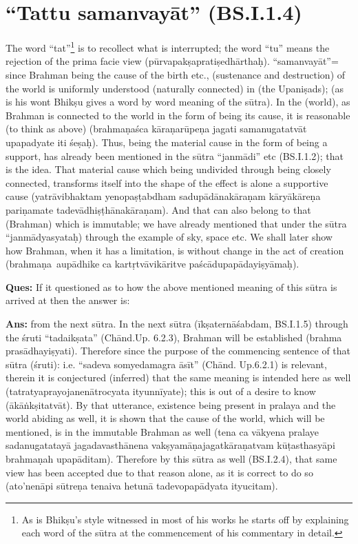 \section*{“Tattu samanvayāt” (BS.I.1.4)}

The word “tat”\footnote{As is Bhikṣu’s style witnessed in most of his works he starts off by explaining each word of the sūtra at the commencement of his commentary in detail.} is to recollect what is interrupted; the word “tu” means the rejection of the prima facie view (pūrvapakṣapratiṣedhā\-rthaḥ). “samanvayāt”= since Brahman being the cause of the birth etc., (sustenance and destruction) of the world is uniformly understood (naturally connected) in (the Upaniṣads); (as is his wont Bhikṣu gives a word by word meaning of the sūtra). In the (world), as Brahman is connected to the world in the form of being its cause, it is reasonable (to think as above) (brahmaṇaśca kāraṇarūpeṇa jagati samanugatatvāt upapadyate iti śeṣaḥ). Thus, being the material cause in the form of being a support, has already been mentioned in the sūtra “janmādi” etc (BS.I.1.2); that is the idea. That material cause which being undivided through being closely connected, transforms itself into the shape of the effect is alone  a supportive cause (yatrāvibhaktam yenopaṣṭabdham sadupādānakāraṇam kāryākāreṇa pariṇamate tadevādhiṣṭhānakāraṇam).  And that can also belong to that (Brahman) which is immutable; we have already mentioned that under the sūtra “janmādyasyataḥ) through the example of sky, space etc. We shall later show how Brahman, when it has a limitation, is without change in the act of creation (brahmaṇa aupādhike ca kartṛtvāvikāritve paścādupapādayiṣyāmaḥ).

\textbf{Ques:} If it questioned as to how the above mentioned meaning of this sūtra is arrived at then the answer is: 

\textbf{Ans:} from the next sūtra. In the next sūtra (īkṣaternāśabdam, BS.I.1.5) through the śruti “tadaikṣata” (Chānd.Up. 6.2.3), Brahman will be established (brahma prasādhayiṣyati).  Therefore since the purpose of the commencing sentence of that sūtra (śruti): i.e. “sadeva somyedamagra āsīt” (Chānd. Up.6.2.1) is relevant, therein it is conjectured (inferred) that the same meaning is intended here as well (tatratyaprayojanenātrocyata ityunnīyate); this is out of a desire to know (ākāṅkṣitatvāt). By that utterance, existence being present in pralaya and the world abiding as well, it is shown that the cause of the world, which will be mentioned, is in the immutable Brahman as well (tena ca vākyena pralaye sadanugatatayā jagadavasthānena vakṣyamāṇajagatkāraṇatvam kūṭasthasyāpi brahmaṇah upapāditam). Therefore by this sūtra as well (BS.I.2.4), that same view has been accepted due to that reason alone, as it is correct to do so (ato’nenāpi sūtreṇa tenaiva hetunā tadevopapādyata ityucitam).

